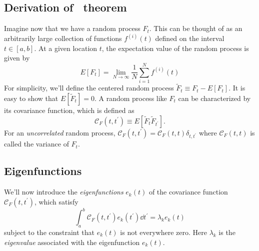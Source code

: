 \subsection{Derivation of \KL\ theorem}
Imagine now that we have a random process $F_t$.  This can be thought of as
an arbitrarily large collection of functions $f^{(i)}(t)$ defined
on the interval
$t \in [a, b]$.  At a given location $t$, the expectation value of the
random process is given by
\begin{equation}
  E[F_t] = \lim_{N \to \infty} \frac{1}{N} \sum_{i=1}^N f^{(i)}(t)
\end{equation}
For simplicity, we'll define the centered random process
$\tilde{F}_t \equiv F_t - E[F_t]$.  It is easy to show that
$E[\tilde{F}_t] = 0$.  A random process like $F_t$ can be characterized
by its covariance function, which is defined as
\begin{equation}
  \label{eq:corrfunc_def}
  \mathcal{C}_F(t, t^\prime) \equiv E[\tilde{F}_t \tilde{F}_{t^\prime}].
\end{equation}
For an {\it uncorrelated} random process,
$\mathcal{C}_F(t, t^\prime) = \mathcal{C}_F(t, t) \delta_{t, t^\prime}$
where $\mathcal{C}_F(t, t) $ is called the variance of $F_t$.

\subsection{Eigenfunctions}
We'll now introduce the {\it eigenfunctions} $e_k(t)$
of the covariance function $\mathcal{C}_F(t, t^\prime)$, which satisfy
\begin{equation}
  \label{eq:eigfunc_def}
  \int_a^b \mathcal{C}_F(t, t^\prime) e_k(t^\prime)\dd t^\prime
  = \lambda_k e_k(t)
\end{equation}
subject to the constraint that $e_k(t)$ is not everywhere zero.
Here $\lambda_k$ is the {\it eigenvalue} associated with the
eigenfunction $e_k(t)$.

